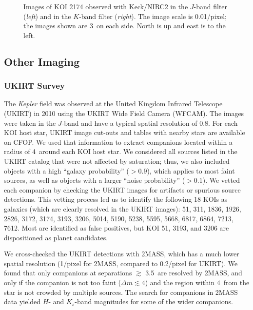 \documentclass[twocolumn,appendixfloats]{aastex6}
\begin{document}
\begin{figure}[!t]
\caption{Images of KOI 2174 observed with Keck/NIRC2 in the $J$-band filter
({\it left}) and in the $K$-band filter ({\it right}). The image scale is 0.01\arcsec/pixel; 
the images shown are 3\arcsec\ on each side. North is up and east is to the
left.
\label{KOI2174_highres}}
\end{figure}


\vspace{1ex}

\subsection{Other Imaging}
\label{other_ima}

\subsubsection{UKIRT Survey}

The {\it Kepler} field was observed at the United Kingdom Infrared Telescope (UKIRT)
in 2010 using the UKIRT Wide Field Camera (WFCAM). The images were taken
in the $J$-band and have a typical spatial resolution of 0.8\arcsec.
For each KOI host star, UKIRT image cut-outs and tables with nearby stars are available
on CFOP. We used that information to extract companions located within a radius of 
4\arcsec\ around each KOI host star. We considered all sources listed in the
UKIRT catalog that were not affected by saturation; thus, we also included objects 
with a high ``galaxy probability'' ($>0.9$), which applies to most faint sources, as well
as objects with a larger ``noise probability'' ($>0.1$). We vetted each companion by 
checking the UKIRT images for artifacts or spurious source detections. This vetting 
process led us to identify the following 18 KOIs as galaxies (which are clearly 
resolved in the UKIRT images): 51, 311, 1836, 1926, 2826, 3172, 3174, 3193, 
3206, 5014, 5190, 5238, 5595, 5668, 6817, 6864, 7213, 7612. Most are identified 
as false positives, but KOI 51, 3193, and 3206 are dispositioned as planet candidates. 

We cross-checked the UKIRT detections with 2MASS, which has a much lower
spatial resolution (1\arcsec/pixel for 2MASS, compared to 0.2\arcsec/pixel for 
UKIRT). We found that only companions at separations $\gtrsim$ 3.5\arcsec\ 
are resolved by 2MASS, and only if the companion is not too faint ($\Delta m 
\lesssim 4$) and the region within 4\arcsec-5\arcsec\ from the star is not crowded 
by multiple sources. The search for companions in 2MASS data yielded $H$- and 
$K_s$-band magnitudes for some of the wider companions.
\end{document}
